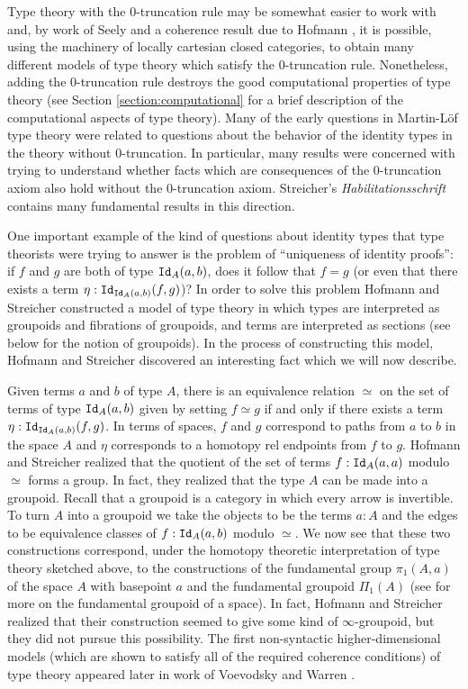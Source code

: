 \documentclass{amsart}
\newcommand{\id}[1]{\textnormal{\texttt{Id}}_{#1}}
\theoremstyle{definition}
\theoremstyle{remark}
\numberwithin{equation}{section}
\begin{document}
Type theory with the 0-truncation rule may
be somewhat easier to work with and, by work of Seely
\cite{Seely:1984jw} and a coherence result due to Hofmann \cite{Hofmann:1995be}, it is
possible, using the machinery of locally cartesian closed categories,
to obtain many different models of type theory which satisfy the
0-truncation rule.  Nonetheless, adding the 0-truncation rule destroys
the good computational properties of type theory (see Section
\ref{section:computational} for a brief description of the
computational aspects of type theory).  Many of the early questions in
Martin-L\"{o}f type theory were related to questions about the
behavior of the identity types in the theory without 0-truncation.  In
particular, many results were concerned with trying to understand
whether facts which are consequences of the 0-truncation axiom also
hold without the 0-truncation axiom.  Streicher's
\emph{Habilitationsschrift} \cite{Streicher:vg} contains many fundamental results in this
direction.

One important example of the kind of questions about identity types
that type theorists were trying to answer is the problem of
``uniqueness of identity proofs'': if $f$ and $g$ are both of type
$\id{A}(a,b)$, does it follow that $f=g$ (or even that there exists a
term $\eta:\id{\id{A}(a,b)}(f,g)$)?  In order to solve this problem
Hofmann and Streicher \cite{Hofmann:1998ty} constructed a model of
type theory in which types are interpreted as groupoids and fibrations
of groupoids, and terms are interpreted as sections (see below for the
notion of groupoids).  In the process of
constructing this model, Hofmann and Streicher discovered an
interesting fact which we will now describe.

Given terms $a$ and $b$ of type $A$, there is an equivalence relation
$\simeq$ on the set of terms of type $\id{A}(a,b)$ given by setting
$f\simeq g$ if and only if there exists a term
$\eta:\id{\id{A}(a,b)}(f,g)$.  In terms of spaces, $f$ and $g$
correspond to paths from $a$ to $b$ in the space $A$ and $\eta$
corresponds to a homotopy rel endpoints from $f$ to $g$.  Hofmann and
Streicher realized that the quotient of the set
of terms $f:\id{A}(a,a)$ modulo $\simeq$ forms a group.  In fact, they
realized that the type $A$ can be made into a groupoid.  Recall that a
groupoid is a category in which every arrow is invertible.  To turn
$A$ into a groupoid we take the objects to be the terms $a:A$ and the
edges to be equivalence classes of $f:\id{A}(a,b)$ modulo $\simeq$.
We now see that these two constructions correspond, under the homotopy
theoretic interpretation of type theory sketched above, to the
constructions of the fundamental group $\pi_{1}(A,a)$ of the space $A$
with basepoint $a$ and the fundamental groupoid $\Pi_{1}(A)$ (see
\cite{Brown:2006tj} for more on the fundamental groupoid of a space).
In fact, Hofmann and Streicher realized that their construction seemed to give
some kind of $\infty$-groupoid, but they did not pursue
this possibility.  The first non-syntactic higher-dimensional models (which
are shown to satisfy all of the required coherence conditions) of type theory
appeared later in work of Voevodsky \cite{Voevodsky:2009,Kapulkin:USS} and Warren
\cite{Warren:2008ts,Warren:2011tn}.
\end{document}
